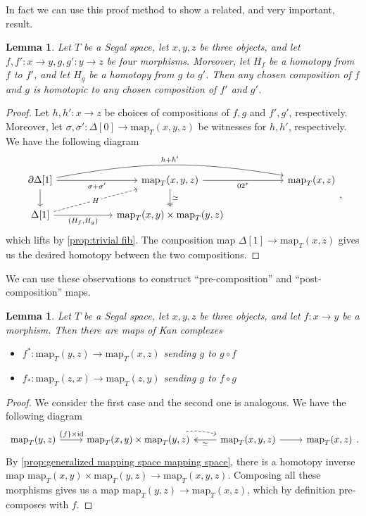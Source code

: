 \documentclass[11pt, a4paper]{amsart}
\newcommand{\map}{\mathrm{map}}
\newcommand{\id}{\mathrm{id}}
\newtheorem{lemma}[equation]{Lemma}
\theoremstyle{definition}
\theoremstyle{remark}
\numberwithin{equation}{section}
\begin{document}
In fact we can use this proof method to show a related, and very important, result.

\begin{lemma} \label{lemma:homotopic compositions well defined}
 Let $T$ be a Segal space, let $x,y,z$ be three objects, and let $f,f' \colon x \to y, g, g' \colon y \to z$ be four morphisms. Moreover, let $H_f$ be a homotopy from $f$ to $f'$, and let $H_g$ be a homotopy from $g$ to $g'$. Then any chosen composition of \(f\) and \(g\) is homotopic to any chosen composition of \(f'\) and \(g'\).
\end{lemma}

\begin{proof}
  Let $h, h' \colon x \to z$ be choices of compositions of $f,g$ and $f',g'$, respectively. Moreover, let $\sigma, \sigma'\colon \Delta[0] \to \map_T(x,y,z)$ be witnesses for $h,h'$, respectively. We have the following diagram
 \[ 
 \begin{tikzcd}[column sep = 2cm]
  \partial \Delta[1] \arrow[rr, "h + h'", bend left = 10] \arrow[r, " \sigma + \sigma'"'] \arrow[d] & \map_T(x,y,z) \arrow[r, "02^*"'] \arrow[d, twoheadrightarrow, "\simeq"]  & \map_T(x,z) \\
 \Delta[1] \arrow[ur, "H" description, dashed] \arrow[r, "{(H_f,H_g)}"'] & \map_T(x,y) \times \map_T(y,z)
\end{tikzcd},
\]
which lifts by \cref{prop:trivial fib}. The composition map $\Delta[1] \to \map_T(x,z)$ gives us the desired homotopy between the two compositions.
\end{proof}

We can use these observations to construct ``pre-composition'' and ``post-composition'' maps.

\begin{lemma} \label{lemma:pre post composition}
  Let $T$ be a Segal space, let $x,y,z$ be three objects, and let $f\colon x \to y$ be a morphism. Then there are maps of Kan complexes
  \begin{itemize}
    \item $f^*\colon\map_T(y,z) \to \map_T(x,z)$ sending $g$ to $g \circ f$
    \item $f_*\colon\map_T(z,x) \to \map_T(z,y)$ sending $g$ to $f \circ g$
  \end{itemize}
\end{lemma}

\begin{proof}
 We consider the first case and the second one is analogous. We have the following diagram
\[
 \begin{tikzcd}
  \map_T(y,z) \arrow[r, "\{f\} \times \id"] & \map_T(x,y) \times \map_T(y,z) \arrow[r, dashed, bend left= 10] & \map_T(x,y,z) \arrow[l, "\simeq", twoheadrightarrow] \arrow[r] & \map_T(x,z)
 \end{tikzcd}.
 \]
By \cref{prop:generalized mapping space mapping space}, there is a homotopy inverse map $\map_T(x,y) \times \map_T(y,z) \to  \map_T(x,y,z)$. Composing all these morphisms gives us a map $\map_T(y,z) \to \map_T(x,z)$, which by definition pre-composes with $f$. 
\end{proof}
\end{document}
